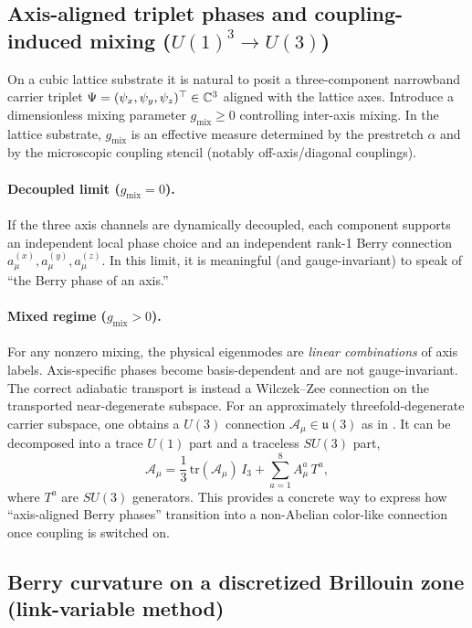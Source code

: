 \subsection{Axis-aligned triplet phases and coupling-induced mixing ($U(1)^3\rightarrow U(3)$)}
\label{subsec:axis-triplet}

On a cubic lattice substrate it is natural to posit a three-component narrowband carrier triplet
$\Psi=(\psi_x,\psi_y,\psi_z)^\top\in\mathbb{C}^3$ aligned with the lattice axes.
Introduce a dimensionless mixing parameter $g_{\mathrm{mix}}\ge 0$ controlling inter-axis mixing.
In the lattice substrate, $g_{\mathrm{mix}}$ is an effective measure determined by the prestretch $\alpha$ and by
the microscopic coupling stencil (notably off-axis/diagonal couplings).

\paragraph{Decoupled limit ($g_{\mathrm{mix}}=0$).}
If the three axis channels are dynamically decoupled, each component supports an independent local phase choice
and an independent rank-1 Berry connection $a_\mu^{(x)},a_\mu^{(y)},a_\mu^{(z)}$.
In this limit, it is meaningful (and gauge-invariant) to speak of ``the Berry phase of an axis.''

\paragraph{Mixed regime ($g_{\mathrm{mix}}>0$).}
For any nonzero mixing, the physical eigenmodes are \emph{linear combinations} of axis labels.
Axis-specific phases become basis-dependent and are not gauge-invariant.
The correct adiabatic transport is instead a Wilczek--Zee connection on the transported near-degenerate subspace.
For an approximately threefold-degenerate carrier subspace, one obtains a $U(3)$ connection
$\mathcal{A}_\mu\in\mathfrak{u}(3)$ as in .
It can be decomposed into a trace $U(1)$ part and a traceless $SU(3)$ part,
\begin{equation}
  \mathcal{A}_\mu
  = \frac{1}{3}\,\mathrm{tr}(\mathcal{A}_\mu)\,I_3
  + \sum_{a=1}^{8} A^a_\mu\,T^a,
\end{equation}
where $T^a$ are $SU(3)$ generators.
This provides a concrete way to express how ``axis-aligned Berry phases'' transition into a non-Abelian color-like
connection once coupling is switched on.

\subsection{Berry curvature on a discretized Brillouin zone (link-variable method)}
\label{subsec:bz-berry}


